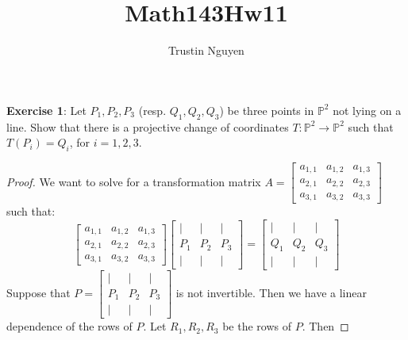 \documentclass{article}
\title{Math143Hw11}
\author{Trustin Nguyen}
\begin{document}
    \maketitle

\reversemarginpar

\textbf{Exercise 1}: Let $P_{1}, P_{2}, P_{3}$ (resp. $Q_{1}, Q_{2}, Q_{3}$) be three points in $\mathbb{P}^{2}$ not lying on a line. Show that there is a projective change of coordinates $T : \mathbb{P}^{2} \rightarrow \mathbb{P}^{2}$ such that $T(P_{i}) = Q_{i}$, for $i = 1, 2, 3$.
    \begin{proof}
        We want to solve for a transformation matrix $A = \begin{bmatrix}
            a_{1, 1} & a_{1, 2} & a_{1, 3} \\
            a_{2, 1} & a_{2, 2} & a_{2, 3} \\
            a_{3, 1} & a_{3, 2} & a_{3, 3}   
        \end{bmatrix}$ such that:
            \begin{equation*}
                \begin{bmatrix}
                    a_{1, 1} & a_{1, 2} & a_{1, 3} \\
                    a_{2, 1} & a_{2, 2} & a_{2, 3} \\
                    a_{3, 1} & a_{3, 2} & a_{3, 3}   
                \end{bmatrix} \begin{bmatrix}
                    \mid   &  \mid &  \mid \\
                     P_{1} & P_{2} & P_{3} \\
                    \mid   &  \mid &  \mid   
                \end{bmatrix} = \begin{bmatrix}
                    \mid  &  \mid &  \mid \\
                    Q_{1} & Q_{2} & Q_{3} \\
                    \mid  &  \mid &  \mid   
                \end{bmatrix}
            \end{equation*}
       Suppose that $P = \begin{bmatrix}
            \mid   &  \mid &  \mid \\
             P_{1} & P_{2} & P_{3} \\
            \mid   &  \mid &  \mid   
        \end{bmatrix}$ is not invertible. Then we have a linear dependence of the rows of $P$. Let $R_{1}, R_{2}, R_{3}$ be the rows of $P$. Then

\end{proof}
\end{document}
